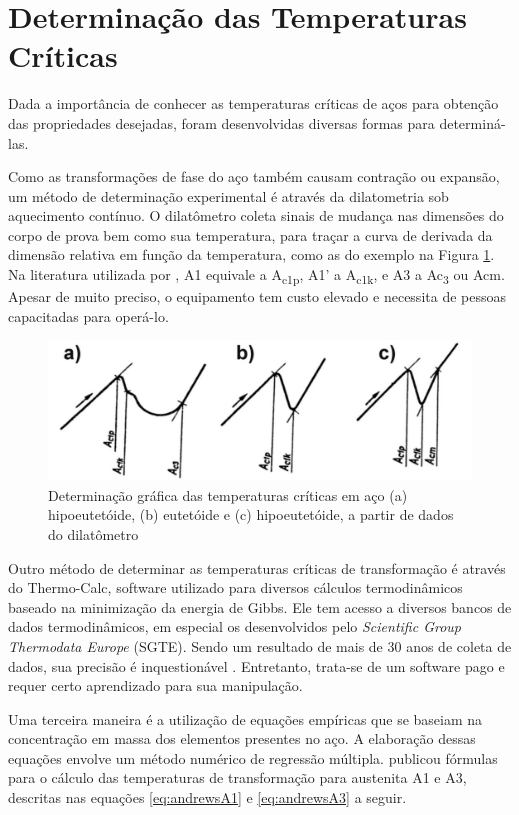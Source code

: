 \documentclass[brazil,tese,epusp]{usp}
\begin{document}
\section{Determinação das Temperaturas Críticas}

Dada a importância de conhecer as temperaturas críticas de aços para obtenção das propriedades desejadas, foram desenvolvidas diversas formas para determiná-las.

Como as transformações de fase do aço também causam contração ou expansão, um método de determinação experimental é através da dilatometria sob aquecimento contínuo. O dilatômetro coleta sinais de mudança nas dimensões do corpo de prova bem como sua temperatura, para traçar a curva de derivada da dimensão relativa em função da temperatura, como as do exemplo na Figura \ref{fig:dilatometer}. Na literatura utilizada por , A1 equivale a A\textsubscript{c1p}, A1' a A\textsubscript{c1k}, e A3 a Ac\textsubscript{3} ou Acm. Apesar de muito preciso, o equipamento tem custo elevado e necessita de pessoas capacitadas para operá-lo.

\begin{figure}[ht!]
  \includegraphics[width=.9\textwidth]{img/dilatometer.png}
  \caption{Determinação gráfica das temperaturas críticas em aço (a) hipoeutetóide, (b) eutetóide e (c) hipoeutetóide, a partir de dados do dilatômetro \cite{Pawlowski2012}}
  \label{fig:dilatometer}
\end{figure}

Outro método de determinar as temperaturas críticas de transformação é através do Thermo-Calc\textregistered{}, software utilizado para diversos cálculos termodinâmicos baseado na minimização da energia de Gibbs. Ele tem acesso a diversos bancos de dados termodinâmicos, em especial os desenvolvidos pelo \textit{Scientific Group Thermodata Europe} (SGTE). Sendo um resultado de mais de 30 anos de coleta de dados, sua precisão é inquestionável \cite{TC2002}. Entretanto, trata-se de um software pago e requer certo aprendizado para sua manipulação.

Uma terceira maneira é a utilização de equações empíricas que se baseiam na concentração em massa dos elementos presentes no aço. A elaboração dessas equações envolve um método numérico de regressão múltipla.
   publicou fórmulas para o cálculo das temperaturas de transformação para austenita A1 e A3, descritas nas equações \ref{eq:andrewsA1} e \ref{eq:andrewsA3} a seguir.
\end{document}
